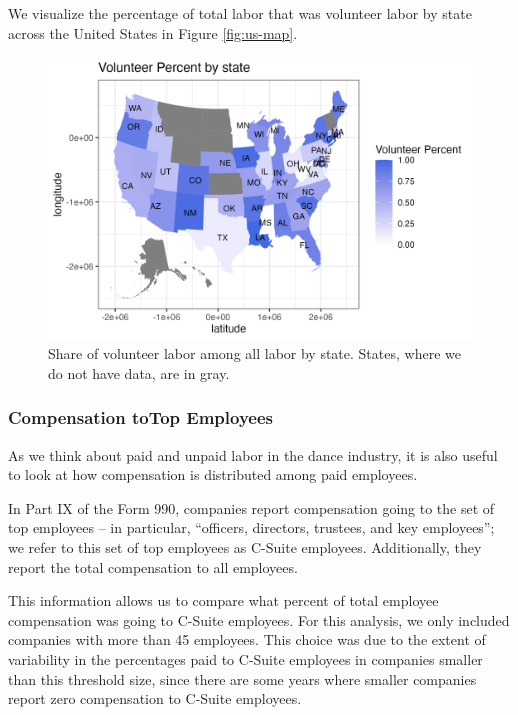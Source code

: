 \documentclass[Dance Data
Project,article,submit,moreauthors,pdftex]{mdpi}
\begin{document}
We visualize the percentage of total labor that was volunteer labor by
state across the United States in Figure \ref{fig:us-map}.

\begin{figure}[H]
\includegraphics[width=0.9\linewidth,]{../images/vol_map} \caption{\label{fig:us-map}Share of volunteer labor among all labor by state. States, where we do not have data, are in gray.}\label{fig:unnamed-chunk-16}
\end{figure}

\hypertarget{compensation-totop-employees}{%
\subsubsection{Compensation toTop
Employees}\label{compensation-totop-employees}}

As we think about paid and unpaid labor in the dance industry, it is
also useful to look at how compensation is distributed among paid
employees.

In Part IX of the Form 990, companies report compensation going to the
set of top employees -- in particular, ``officers, directors, trustees,
and key employees''; we refer to this set of top employees as C-Suite
employees. Additionally, they report the total compensation to all
employees.

This information allows us to compare what percent of total employee
compensation was going to C-Suite employees. For this analysis, we only
included companies with more than 45 employees. This choice was due to
the extent of variability in the percentages paid to C-Suite employees
in companies smaller than this threshold size, since there are some
years where smaller companies report zero compensation to C-Suite
employees.
\end{document}
